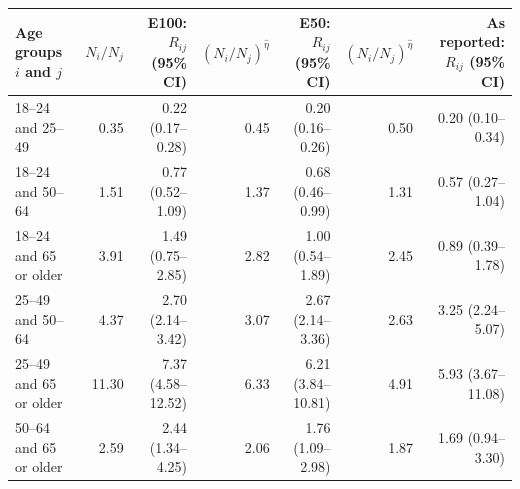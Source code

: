 \begin{tabular}{lrrrrrr}
\toprule
Age groups $i$ and $j$ & $N_i/N_j$ & E100: $R_{ij}$ (95\% CI) & $(N_i/N_j)^{\hat\eta}$ & E50: $R_{ij}$ (95\% CI) & $(N_i/N_j)^{\hat\eta}$ & As reported: $R_{ij}$ (95\% CI) \\
\midrule
18--24 and 25--49 & 0.35 & 0.22 (0.17--0.28) & 0.45 & 0.20 (0.16--0.26) & 0.50 & 0.20 (0.10--0.34) \\
18--24 and 50--64 & 1.51 & 0.77 (0.52--1.09) & 1.37 & 0.68 (0.46--0.99) & 1.31 & 0.57 (0.27--1.04) \\
18--24 and 65 or older & 3.91 & 1.49 (0.75--2.85) & 2.82 & 1.00 (0.54--1.89) & 2.45 & 0.89 (0.39--1.78) \\
25--49 and 50--64 & 4.37 & 2.70 (2.14--3.42) & 3.07 & 2.67 (2.14--3.36) & 2.63 & 3.25 (2.24--5.07) \\
25--49 and 65 or older & 11.30 & 7.37 (4.58--12.52) & 6.33 & 6.21 (3.84--10.81) & 4.91 & 5.93 (3.67--11.08) \\
50--64 and 65 or older & 2.59 & 2.44 (1.34--4.25) & 2.06 & 1.76 (1.09--2.98) & 1.87 & 1.69 (0.94--3.30) \\
\bottomrule
\end{tabular}
